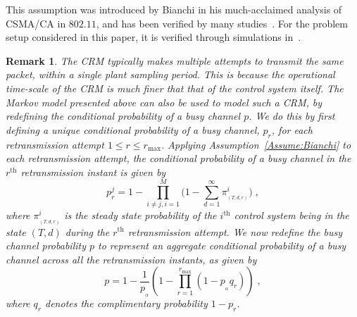 \documentclass[twocolumn]{autart}
\newtheorem{remark}{Remark}[section]
\begin{document}
This assumption was introduced by Bianchi in his much-acclaimed analysis of CSMA/CA in $802.11$, and has been verified by many studies~\cite{Bianchi2000,Ramachandran2007,Pollin2008}. For the problem setup considered in this paper, it is verified through simulations in~\cite{Ramesh2011b}.
\begin{remark}\textbf{} \label{Remark:Retx}
The CRM typically makes multiple attempts to transmit the same packet, within a single plant sampling period. This is because the operational time-scale of the CRM is much finer that that of the control system itself. The Markov model presented above can also be used to model such a CRM, by redefining the conditional probability of a busy channel $p$. We do this by first defining a unique conditional probability of a busy channel, $p_r$, for each retransmission attempt $1 \le r \le r_{\max}$. Applying Assumption~\ref{Assume:Bianchi} to each retransmission attempt, the conditional probability of a busy channel in the $r^{\textrm{th}}$ retransmission instant is given by
\begin{equation} \label{Eq:pCondr}
p^{j}_r = 1- \prod_{i \neq j, i = 1}^{M} \big( 1- \sum_{d=1}^{\infty} \pi^{i}_{_{(T,d,r)}}\big) \; ,
\end{equation}
where $\pi^{i}_{_{(T,d,r)}}$ is the steady state probability of the $i^{\textrm{th}}$ control system being in the state $(T,d)$ during the $r^{\textrm{th}}$ retransmission attempt. We now redefine the busy channel probability $p$ to represent an aggregate conditional probability of a busy channel across all the retransmission instants, as given by
\begin{equation} \label{Eq:pBianchiRetx}
p = 1 - \frac{1}{p_{_{\alpha}}} \left( 1 - \prod_{r=1}^{r_{\max}} (1 - p_{_{\alpha}} q_r) \right) \; ,
\end{equation}
where $q_r$ denotes the complimentary probability $1-p_r$.
\end{remark}
\end{document}
